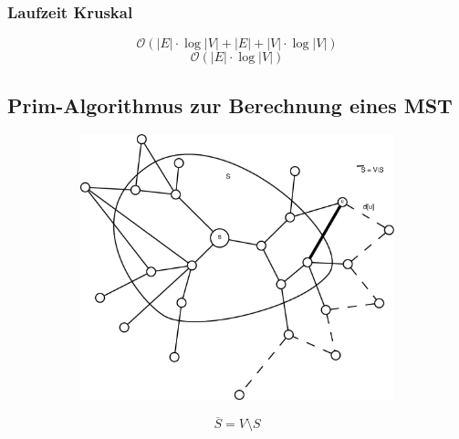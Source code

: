 \subsubsection{Laufzeit Kruskal}
\[ \mathcal{O}(|E|\cdot\log|V|+|E|+|V|\cdot\log|V|) \]
\[ \mathcal{O}(|E|\cdot\log|V|) \]
\pagebreak
\subsection{Prim-Algorithmus zur Berechnung eines MST}

\begin{figure}[h]
\centering
\begin{subfigure}[h]{0.4\textwidth}
	\includegraphics[width=\linewidth]{20/Grafik/img2}
	\caption*{}
	\[ \overline{S} = V \setminus S \]
\end{subfigure}
\begin{subfigure}[h]{0.4\textwidth}

\end{subfigure}
\end{figure}
